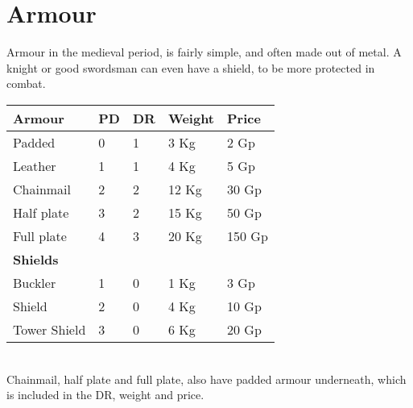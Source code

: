 \chapter{Armour}
Armour in the medieval period, is fairly simple, and often made out of metal. A knight or good swordsman can even have a shield, to be more protected in combat.\\

\begin{tabular}{|l|l|l|l|l|}\hline
\rowcolor{gray!50}
    \textbf{Armour} &\textbf{PD}&\textbf{DR}&\textbf{Weight}&\textbf{Price} \\ \hline
    Padded          & 0  & 1 & 3 Kg & 2 Gp  \\
    Leather         & 1  & 1 & 4 Kg & 5 Gp  \\
    Chainmail       & 2  & 2 & 12 Kg& 30 Gp \\
    Half plate      & 3  & 2 & 15 Kg& 50 Gp \\
    Full plate      & 4  & 3 & 20 Kg& 150 Gp\\ \hline
 \textbf{Shields} \\\hline
    Buckler         & 1 & 0  & 1 Kg & 3 Gp\\
    Shield          & 2 & 0  & 4 Kg & 10 Gp\\
    Tower Shield    & 3 & 0  & 6 Kg & 20 Gp\\
    \hline
\end{tabular}
\\

Chainmail, half plate and full plate, also have padded armour underneath, which is included in the DR, weight and price.